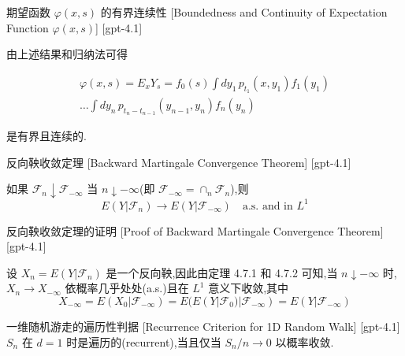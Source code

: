 \documentclass[UTF8]{ctexart}
\begin{document}
    
    
    \begin{crl}
        {期望函数 $\varphi(x, s)$ 的有界连续性}
        [Boundedness and Continuity of Expectation Function $\varphi(x, s)$]
        [gpt-4.1]
        
由上述结果和归纳法可得

\[
\begin{array}{c}
\varphi(x, s) = E_{x} Y_{s} = f_{0}(s) \displaystyle \int d y_{1}\, p_{t_{1}}(x, y_{1}) f_{1}(y_{1}) \\
\displaystyle \ldots \int d y_{n}\, p_{t_{n} - t_{n-1}}(y_{n-1}, y_{n}) f_{n}(y_{n})
\end{array}
\]

是有界且连续的.

    \end{crl}
    
    
    
    \begin{thm}
        {反向鞅收敛定理}
        [Backward Martingale Convergence Theorem]
        [gpt-4.1]
        
如果 $\mathcal{F}_{n} \downarrow \mathcal{F}_{-\infty}$ 当 $n \downarrow -\infty$(即 ${\mathcal{F}}_{-\infty} = \cap_{n} {\mathcal{F}}_{n}$),则
\[
E(Y | \mathcal{F}_{n}) \to E(Y | \mathcal{F}_{-\infty}) \quad \text{a.s. and in } L^{1}
\]

    \end{thm}
    
    
    
    \begin{prf}
        {反向鞅收敛定理的证明}
        [Proof of Backward Martingale Convergence Theorem]
        [gpt-4.1]
        
设 $X_{n} = E(Y | \mathcal{F}_{n})$ 是一个反向鞅,因此由定理 4.7.1 和 4.7.2 可知,当 $n \downarrow -\infty$ 时,$X_{n} \to X_{-\infty}$ 依概率几乎处处(a.s.)且在 $L^{1}$ 意义下收敛,其中
\[
X_{-\infty} = E(X_{0} | \mathcal{F}_{-\infty}) = E(E(Y | \mathcal{F}_{0}) | \mathcal{F}_{-\infty}) = E(Y | \mathcal{F}_{-\infty})
\]

    \end{prf}
    
    
    
    \begin{thm}
        {一维随机游走的遍历性判据}
        [Recurrence Criterion for 1D Random Walk]
        [gpt-4.1]
        $S_{n}$ 在 $d = 1$ 时是遍历的(recurrent),当且仅当 $S_{n} / n \to 0$ 以概率收敛.
    \end{thm}
    
\end{document}
